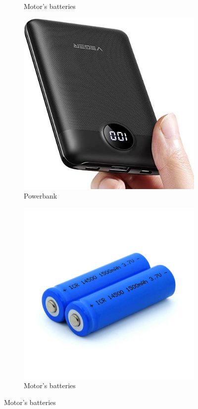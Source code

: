 \documentclass[12pt,a4paper]{article}
\begin{document}
\begin{large}
\begin{figure}[hb]
\begin{subfigure}{0.2\textwidth}
    \caption{Motor's batteries}
    \label{fig:right}
    \end{subfigure}
  \begin{subfigure}{0.2\textwidth}
    \centering
    \includegraphics[width = \textwidth]{images/powerbank.jpg}
    \caption{Powerbank}
    \label{fig:right}
    \end{subfigure}
  \begin{subfigure}{0.2\textwidth}
    \centering
    \includegraphics[width = \textwidth]{images/batterie.jpg}
    \caption{Motor's batteries}
    \label{fig:right}
    \end{subfigure}
  \label{fig:combined}
\end{figure}


\end{large}
\end{document}
